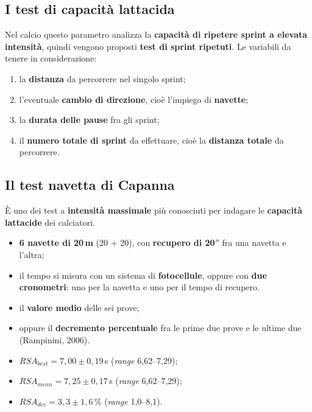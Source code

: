 \subsection{I test di capacità lattacida}

Nel calcio questo parametro analizza la \textbf{capacità di ripetere sprint a elevata intensità},
quindi vengono proposti \textbf{test di sprint ripetuti}. Le variabili da tenere in considerazione:
\begin{enumerate}
  \item la \textbf{distanza} da percorrere nel singolo sprint;
  \item l'eventuale \textbf{cambio di direzione}, cioè l'impiego di \textbf{navette};
  \item la \textbf{durata delle pause} fra gli sprint;
  \item il \textbf{numero totale di sprint} da effettuare, cioè la \textbf{distanza totale} da
    percorrere.
\end{enumerate}

\subsection{Il test navetta di Capanna}
\label{sec:test-capanna}

È uno dei test a \textbf{intensità massimale} più conosciuti per indagare le \textbf{capacità
lattacide} dei calciatori.

\begin{itemize}
  \item \textbf{6 navette di 20\,m} (20 $+$ 20), con \textbf{recupero di 20$''$} fra una navetta e
    l'altra;
  \item il tempo si misura con un sistema di \textbf{fotocellule}, oppure con \textbf{due
    cronometri}: uno per la navetta e uno per il tempo di recupero.
\end{itemize}

\begin{itemize}
  \item il \textbf{valore medio} delle sei prove;
  \item oppure il \textbf{decremento percentuale} fra le prime due prove e le ultime due
    (Rampinini, 2006).
\end{itemize}

\begin{itemize}
  \item $RSA_{best} = 7{,}00 \pm 0{,}19$\,s (\textit{range} 6,62--7,29);
  \item $RSA_{mean} = 7{,}25 \pm 0{,}17$\,s (\textit{range} 6,62--7,29);
  \item $RSA_{dec} = 3{,}3 \pm 1{,}6$\,\% (\textit{range} 1,0--8,1).
\end{itemize}

